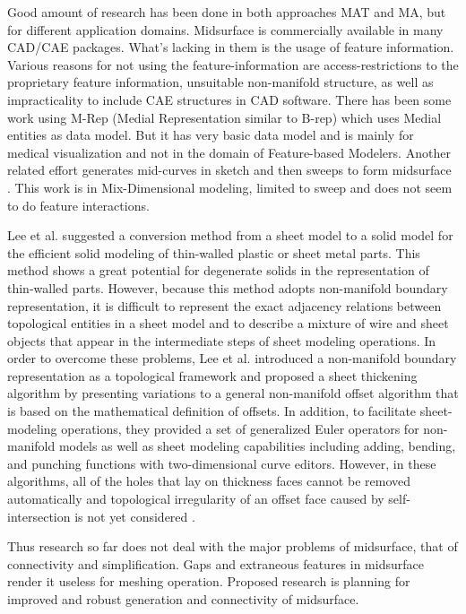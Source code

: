 Good amount of research has been done in both approaches MAT and MA, but for different application domains. Midsurface is commercially available in many CAD/CAE packages. What's lacking in them is the usage of feature information. Various reasons for not using the feature-information are access-restrictions to the proprietary feature information, unsuitable non-manifold structure, as well as impracticality to include CAE structures in CAD software. There has been some work using M-Rep (Medial Representation similar to B-rep) which uses Medial entities as data model. But it has very basic data model and is mainly for medical visualization and not in the domain of Feature-based Modelers\cite{Thall2004}. Another related effort generates mid-curves in sketch and then sweeps to form midsurface \cite{Robinson2006}. This work is in Mix-Dimensional modeling, limited to sweep and does not seem to do feature interactions. 

Lee et al. suggested a conversion method from a sheet model to a solid model for the efficient solid modeling of thin-walled plastic or sheet metal parts. This method shows a great potential for degenerate solids in the representation of thin-walled parts. However, because this method adopts non-manifold boundary representation, it is difficult to represent
the exact adjacency relations between topological entities in a sheet model and to describe a mixture of wire and sheet objects that appear in the intermediate steps of sheet modeling operations. In order to overcome these problems, Lee et al. \cite{Lee2001} introduced a non-manifold boundary representation as a topological framework and proposed
a sheet thickening algorithm by presenting variations to a general non-manifold offset algorithm that is based on the mathematical definition of offsets. In addition, to facilitate sheet-modeling operations,  they provided a set of generalized Euler operators for non-manifold models as well as sheet modeling capabilities including adding, bending, and punching functions with two-dimensional curve editors. However, in these algorithms, all of the holes that lay
on thickness faces cannot be removed automatically and topological irregularity of an offset face caused by self-intersection is not yet considered \cite{Lee2001}.


Thus research so far does not deal with the major problems of midsurface, that of connectivity and simplification. Gaps and extraneous features in midsurface render it useless for meshing operation. Proposed research is planning for improved and robust generation and connectivity of midsurface\cite{Sheen2008}.


